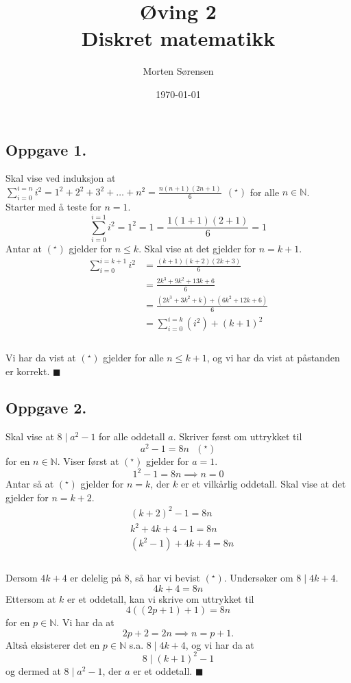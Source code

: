 \documentclass{article}
\title{\huge{Øving 2\\ Diskret matematikk}}
\author{Morten Sørensen}
\date{\today}
\begin{document}
\maketitle

\subsection*{Oppgave 1.}
Skal vise ved induksjon at $\sum_{i=0}^{i=n} i^2 = 1^2 + 2^2 + 3^2 + \dots + n^2 = \frac{n(n + 1)(2n + 1)}{6} \:\:(^\star)$ for alle $n \in \mathbb{N}$. \\
Starter med å teste for $n = 1$. \\
$$\sum_{i=0}^{i = 1} i^2 = 1^2 = 1 = \frac{1(1 + 1)(2 + 1)}{6} = 1$$
Antar at $(^\star)$ gjelder for $n \leq k$. Skal vise at det gjelder for $n = k + 1$.
\begin{align*}
    \sum_{i = 0}^{i = k + 1} i^2 &= \frac{(k + 1)(k + 2)(2k + 3)}{6} \\
    &=  \frac{2k^3 + 9k^2+13k+6}{6} \\
    &= \frac{(2k^3 + 3k^2 + k) + (6k^2 + 12k + 6)}{6} \\
    &=  \sum_{i=0}^{i=k} (i^2) + (k + 1)^2  \\
\end{align*}
\\[-2\baselineskip]
Vi har da vist at $(^\star)$ gjelder for alle $n \leq k + 1$, og vi har da vist at påstanden er korrekt. $\blacksquare$

\subsection*{Oppgave 2.}
Skal vise at $8 \mid a^2 - 1$ for alle oddetall $a$. Skriver først om uttrykket til 
$$a^2 - 1 = 8n \:\:\:(^\star)$$
for en $n \in \mathbb{N}$. Viser først at $(^\star)$ gjelder for $a = 1$.
$$1^2 - 1 = 8n \implies n = 0$$
Antar så at $(^\star)$ gjelder for $n = k$, der $k$ er et vilkårlig oddetall. Skal vise at det gjelder for $n = k + 2$.
\begin{align*}
    &(k+2)^2 - 1 = 8n \\
    &k^2 + 4k + 4 - 1 = 8n \\
    &(k^2 - 1) + 4k + 4 = 8n \\
\end{align*}
\\[-2\baselineskip]
Dersom $4k + 4$ er delelig på 8, så har vi bevist $(^\star)$. Undersøker om $8 \mid 4k + 4$.
$$4k + 4 = 8n$$
Ettersom at $k$ er et oddetall, kan vi skrive om uttrykket til
$$4((2p + 1) + 1) = 8n$$
for en $p \in \mathbb{N}$. Vi har da at 
$$2p + 2 = 2n \implies n = p + 1\text{.}$$
Altså eksisterer det en $p \in \mathbb{N}$ s.a. $8 \mid 4k + 4$, og vi har da at 
$$8 \mid (k + 1)^2 - 1$$
og dermed at $8 \mid a^2 - 1$, der $a$ er et oddetall. $\blacksquare$
\end{document}
